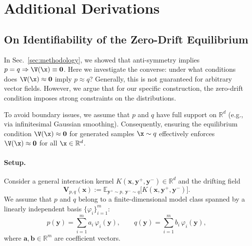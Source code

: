 \section{Additional Derivations}

\subsection{On Identifiability of the Zero-Drift Equilibrium}
\label{sec:theory_identifiability}

In Sec.~\ref{sec:methodology}, we showed that anti-symmetry implies $p=q \Rightarrow \V(\x)\equiv \mathbf{0}$.
Here we investigate the converse: under what conditions does $\V(\x)\approx \mathbf{0}$ imply $p\approx q$?
Generally, this is not guaranteed for arbitrary vector fields.
However, we argue that for our specific construction, the zero-drift condition imposes strong constraints on the distributions.

To avoid boundary issues, we assume that $p$ and $q$ have full support on $\mathbb{R}^d$ (e.g., via infinitesimal Gaussian smoothing). 
Consequently, ensuring the equilibrium condition $\V(\x) \approx \mathbf{0}$ for generated samples $\x \sim q$ effectively enforces $\V(\x) \approx \mathbf{0}$ for all $\x \in \mathbb{R}^d$.

\paragraph{Setup.}
Consider a general interaction kernel $K(\mathbf{x},\mathbf{y}^+,\mathbf{y}^-) \in \mathbb{R}^d$ and the drifting field
\begin{equation}
\mathbf{V}_{p,q}(\mathbf{x}) := \mathbb{E}_{\mathbf{y}^+\sim p,\ \mathbf{y}^-\sim q} \big[ K(\mathbf{x},\mathbf{y}^+,\mathbf{y}^-) \big].
\label{eq:V_general_K}
\end{equation}
We assume that $p$ and $q$ belong to a finite-dimensional model class spanned by a linearly independent basis $\{\varphi_i\}_{i=1}^m$:
\begin{equation}
p(\mathbf{y})=\sum_{i=1}^m a_i\,\varphi_i(\mathbf{y}),\qquad
q(\mathbf{y})=\sum_{i=1}^m b_i\,\varphi_i(\mathbf{y}),
\label{eq:pq_basis}
\end{equation}
where $\mathbf{a},\mathbf{b}\in\mathbb{R}^m$ are coefficient vectors.


